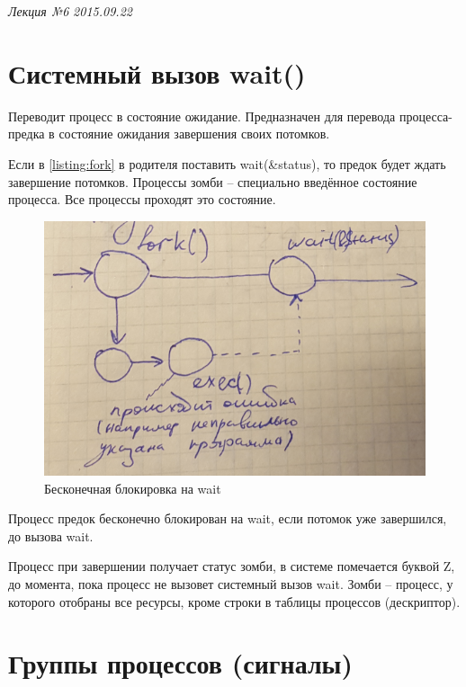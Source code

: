 \clearpage
\begin{flushright}
	\textit{Лекция №6}
	\textit{2015.09.22}
\end{flushright}

\section{Системный вызов wait()}

Переводит процесс в состояние ожидание. Предназначен для перевода процесса-предка в состояние ожидания завершения своих потомков. 

Если в \ref{listing:fork} в родителя поставить wait(\&status), то предок будет ждать завершение потомков. 
Процессы зомби – специально введённое состояние процесса. Все процессы проходят это состояние. 

\begin{figure}[H]
	\centering
	\includegraphics[width=\textwidth]{pic/4.png}
	\caption{Бесконечная блокировка на wait}
\end{figure}

Процесс предок бесконечно блокирован на wait, если потомок уже завершился, до вызова wait.

Процесс при завершении получает статус зомби, в системе помечается буквой Z, до момента, пока процесс не вызовет системный вызов wait.  Зомби – процесс, у которого отобраны все ресурсы, кроме строки в таблицы процессов (дескриптор). 

\section{Группы процессов (сигналы)}

